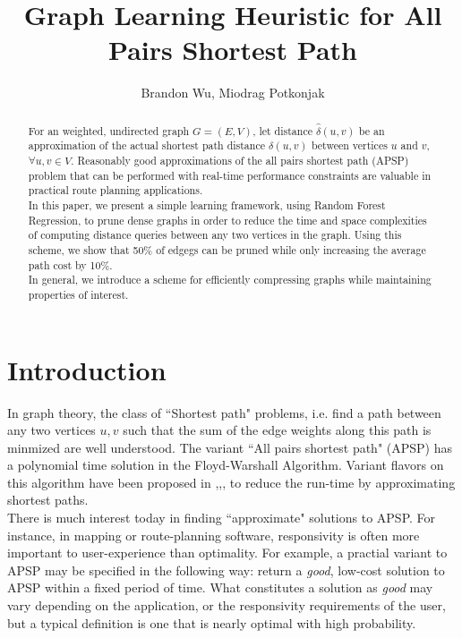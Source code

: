 \documentclass[10.5pt,journal]{IEEEtran}
\begin{document}
%
\title{Graph Learning Heuristic for All Pairs Shortest Path}
\author{Brandon Wu, Miodrag Potkonjak}
\maketitle

\begin{abstract}
For an weighted, undirected graph $G = (E,V)$, let distance $\hat{\delta}(u,v)$ be an approximation of the actual
shortest path distance $\delta(u,v)$ between vertices $u$ and $v$, $\forall u,v\in V$. Reasonably good
approximations of the all pairs shortest path (APSP) problem that can be performed with 
real-time performance constraints are valuable in practical route planning applications.\\

In this paper, we present a simple learning framework, using Random Forest Regression, to prune dense graphs
in order to reduce the time and space complexities of computing distance queries between any two vertices in
the graph. Using this scheme, we show that 50\% of edgegs can be pruned while only increasing the average
path cost by 10\%.\\

In general, we introduce a scheme for efficiently compressing graphs while maintaining properties of interest.
\end{abstract}

\section{Introduction}
In graph theory, the class of ``Shortest path" problems, i.e. find a path between any two vertices $u,v$ such
that the sum of the edge weights along this path is minmized are well understood. The variant ``All pairs
shortest path" (APSP) has a polynomial time solution in the Floyd-Warshall Algorithm.
Variant flavors on this algorithm have been proposed in 
\cite{approx1},\cite{approx2},\cite{neuralNet},\cite{astar}
to reduce the run-time by approximating shortest paths. \\

There is much interest today in finding ``approximate" solutions to APSP. For instance, in mapping or route-planning
software, responsivity is often more important to user-experience than optimality. For example,
a practial variant to APSP may be specified in the following way: return a {\it{good}}, low-cost
solution to APSP within a fixed period of time. What constitutes a solution as {\it{good}}
may vary depending on the application, or the responsivity requirements of the user, but a typical
definition is one that is nearly optimal with high probability.\\
\end{document}
